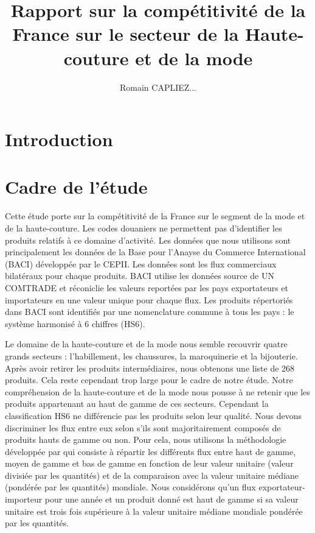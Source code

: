 \documentclass[french,10pt,a4paper]{article}
\title{Rapport sur la compétitivité de la France sur le secteur de la Haute-couture et de la mode}
\author{Romain CAPLIEZ...}
\begin{document}
\maketitle

\section{Introduction}

\newpage

\section{Cadre de l'étude}

Cette étude porte sur la compétitivité de la France sur le segment de la mode et de la haute-couture. Les codes douaniers ne permettent pas d'identifier les produits relatifs à ce domaine d'activité. Les données que nous utilisons sont principalement les données de la Base pour l'Anayse du Commerce International (BACI) \cite{Gaulier2010} développée par le CEPII. Les données sont les flux commerciaux bilatéraux pour chaque produits. BACI utilise les données source de UN COMTRADE et réconiclie les valeurs reportées par les pays exportateurs et importateurs en une valeur unique pour chaque flux. Les produits répertoriés dans BACI sont identifiés par une nomenclature commune à tous les pays : le système harmonisé à 6 chiffres (HS6).

Le domaine de la haute-couture et de la mode nous semble recouvrir quatre grands secteurs : l'habillement, les chaussures, la maroquinerie et la bijouterie. Après avoir retirer les produits intermédiaires, nous obtenons une liste de 268 produits. Cela reste cependant trop large pour le cadre de notre étude. Notre compréhension de la haute-couture et de la mode nous pousse à ne retenir que les produits appartenant au haut de gamme de ces secteurs. Cependant la classification HS6 ne différencie pas les produits selon leur qualité. Nous devons discriminer les flux entre eux selon s'ils sont majoritairement composés de produits hauts de gamme ou non. Pour cela, nous utilisons la méthodologie développée par \cite{Fontagne1997} qui consiste à répartir les différents flux entre haut de gamme, moyen de gamme et bas de gamme en fonction de leur valeur unitaire (valeur divisiée par les quantités) et de la comparaison avec la valeur unitaire médiane (pondérée par les quantités) mondiale. Nous considérons qu'un flux exportateur-importeur pour une année et un produit donné est haut de gamme si sa valeur unitaire est trois fois supérieure à la valeur unitaire médiane mondiale pondérée par les quantités.
\end{document}

